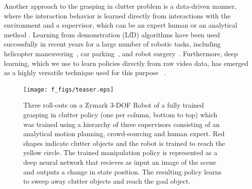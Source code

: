 \documentclass[10pt, conference]{ieeeconf}      %
\begin{document}
Another approach to the grasping in
clutter problem is a data-driven manner, where the interaction behavior is learned directly from interactions with the environment and a supervisor, which can be an expert human or an analytical method \cite{argall2009survey}. Learning from demonstration (LfD) algorithms have been used
successfully in recent years for a large number of robotic tasks, including helicopter
maneuvering~\cite{abbeel2007application}, car parking~\cite{abbeel2008apprenticeship},  and robot
surgery~\cite{van2010superhuman}. Furthermore, deep learning, which we use to learn policies directly from raw video
data, has emerged as a highly versatile technique used for this purpose ~\cite{pinto2015supersizing}.

\begin{figure}
\texttt{[image: f\_figs/teaser.eps]}
\caption{
Three roll-outs on a Zymark 3-DOF Robot of a fully trained grasping in clutter policy (one per column, bottom to top) which was trained using a
hierarchy of three supervisors consisting of an analytical motion planning, crowd-sourcing and human expert. 
Red shapes indicate clutter objects and the robot is trained to reach the yellow circle. The trained manipulation policy is represented as a deep neural network that recieves as input an image of the scene and outputs a change in state position. The resulting policy learns to sweep away clutter objects and reach the goal object. }
\vspace*{-20pt}
\label{fig:teaser}
\end{figure}

\end{document}
